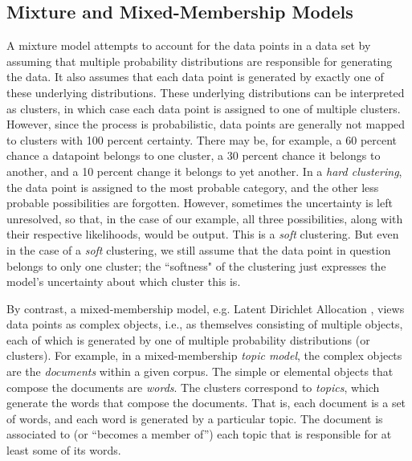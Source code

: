 \subsection{Mixture and Mixed-Membership Models}

A mixture model attempts to account for the data points in a data set 
by assuming that multiple probability
distributions are responsible for generating the data. It also assumes that each data point is generated
by exactly one of these underlying distributions. These underlying 
distributions can be interpreted as clusters, in which case each data point is 
assigned to one of multiple clusters. However, since the process is probabilistic,
data points are generally not mapped to clusters with 100 percent certainty. 
There may be, for example, a 60 percent chance a datapoint belongs to one 
cluster, a 30 percent chance it belongs to another, and a 10 percent change 
it belongs to yet another. In a \emph{hard clustering}, the data point is 
assigned to the most probable category, and the other less probable 
possibilities are forgotten. However, sometimes the uncertainty is left 
unresolved, so that, in the case of our example, all three possibilities, 
along with their respective likelihoods, would be output. This is a 
\emph{soft} clustering. But even in the case of a \emph{soft} clustering, 
we still assume that the data point in question belongs to only one cluster; 
the ``softness" of the clustering just expresses the model's uncertainty 
about which cluster this is. %

By contrast, a mixed-membership model, e.g. Latent Dirichlet Allocation \citep{blei-et-al:2003},
views data points as complex objects, i.e., as themselves consisting of multiple objects, 
each of which is generated by one of multiple probability distributions (or clusters). 
For example, in a mixed-membership \textit{topic model}, the complex objects are the 
\emph{documents} within a given corpus. The simple or elemental objects that compose 
the documents are \emph{words}. The clusters correspond to \emph{topics}, which generate 
the words that compose the documents. That is, each document is a set of words, and each 
word is generated by a particular topic. The document is associated to 
(or ``becomes a member of'') each topic that is
responsible for at least some of its words. 

